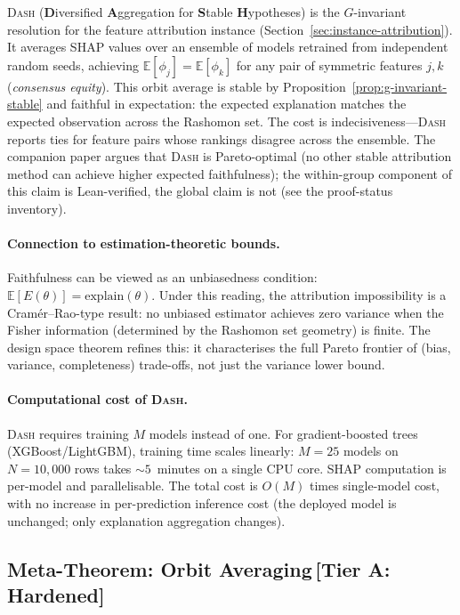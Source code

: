 \documentclass[11pt,a4paper]{article}
\newcommand{\E}{\mathbb{E}}
\newcommand{\DASH}{\textsc{Dash}}
\begin{document}
\DASH{} (\textbf{D}iversified \textbf{A}ggregation for \textbf{S}table \textbf{H}ypotheses)
is the $G$-invariant resolution for the feature attribution instance
(Section~\ref{sec:instance-attribution}).  It averages SHAP values over an
ensemble of models retrained from independent random seeds, achieving
$\E[\phi_j] = \E[\phi_k]$ for any pair of symmetric features $j, k$
(\emph{consensus equity}).  This orbit average is stable by
Proposition~\ref{prop:g-invariant-stable} and faithful in expectation: the
expected explanation matches the expected observation across the Rashomon set.
The cost is indecisiveness---\DASH{} reports ties for feature pairs whose
rankings disagree across the ensemble.  The companion paper argues that
\DASH{} is Pareto-optimal (no other stable attribution method can achieve
higher expected faithfulness); the within-group component of this claim is
Lean-verified, the global claim is not (see the proof-status inventory).

\paragraph{Connection to estimation-theoretic bounds.}
Faithfulness can be viewed as an unbiasedness condition: $\E[E(\theta)] = \text{explain}(\theta)$. Under this reading, the attribution impossibility is a Cram\'er--Rao-type result: no unbiased estimator achieves zero variance when the Fisher information (determined by the Rashomon set geometry) is finite. The design space theorem refines this: it characterises the full Pareto frontier of (bias, variance, completeness) trade-offs, not just the variance lower bound.

\paragraph{Computational cost of \DASH{}.}
\DASH{} requires training $M$ models instead of one. For gradient-boosted trees (XGBoost/LightGBM), training time scales linearly: $M = 25$ models on $N = 10{,}000$ rows takes ${\sim}5$~minutes on a single CPU core. SHAP computation is per-model and parallelisable. The total cost is $O(M)$ times single-model cost, with no increase in per-prediction inference cost (the deployed model is unchanged; only explanation aggregation changes).

\subsection{Meta-Theorem: Orbit Averaging\,\textnormal{\normalsize[Tier A: Hardened]}}
\label{sec:meta-theorem}
\end{document}
